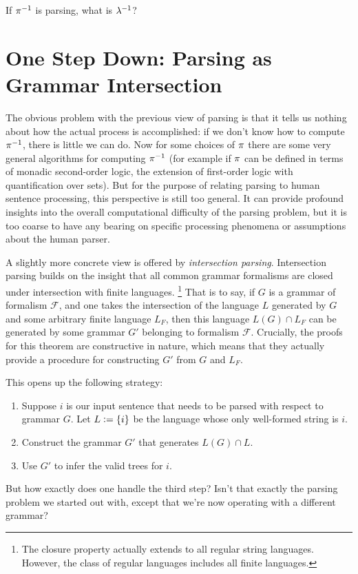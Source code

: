 \begin{exercise}
    If $ \pi^{-1} $ is parsing, what is $ \lambda^{-1} $?
\end{exercise}


\section{One Step Down: Parsing as Grammar Intersection}
\label{sec:ParserOverview_IntersectionParsing}
The obvious problem with the previous view of parsing is that it tells us nothing about how the actual process is accomplished: if we don't know how to compute $ \pi^{-1} $, there is little we can do.
Now for some choices of $\pi$ there are some very general algorithms for computing $ \pi^{-1} $ (for example if $\pi$ can be defined in terms of monadic second-order logic, the extension of first-order logic with quantification over sets).
But for the purpose of relating parsing to human sentence processing, this perspective is still too general.
It can provide profound insights into the overall computational difficulty of the parsing problem, but it is too coarse to have any bearing on specific processing phenomena or assumptions about the human parser.

A slightly more concrete view is offered by \emph{intersection parsing}.
Intersection parsing builds on the insight that all common grammar formalisms are closed under intersection with finite languages.%
\footnote{
    The closure property actually extends to all regular string languages.
    However, the class of regular languages includes all finite languages.
}
That is to say, if $G$ is a grammar of formalism $\mathcal{F}$, and one takes the intersection of the language $L$ generated by $G$ and some arbitrary finite language $L_F$, then this language $L(G) \cap L_F$ can be generated by some grammar $G'$ belonging to formalism $\mathcal{F}$.
Crucially, the proofs for this theorem are constructive in nature, which means that they actually provide a procedure for constructing $G'$ from $G$ and $L_F$.

This opens up the following strategy:
%
\begin{enumerate}
    \item Suppose $i$ is our input sentence that needs to be parsed with respect to grammar $G$.
        Let $L \mathrel{\mathop:}= \left \{ i \right \}$ be the language whose only well-formed string is $i$.
    \item Construct the grammar $G'$ that generates $L(G) \cap L$.
    \item Use $G'$ to infer the valid trees for $i$.
\end{enumerate}
%
But how exactly does one handle the third step?
Isn't that exactly the parsing problem we started out with, except that we're now operating with a different grammar?

